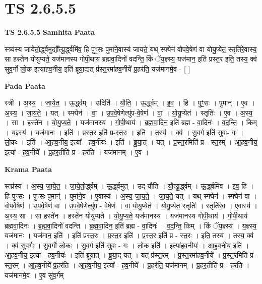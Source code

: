 \documentclass[17pt]{extarticle}
\begin{document}
\section{ TS 2.6.5.5 }

\textbf{TS 2.6.5.5 } \newline
\textbf{Samhita Paata} \newline

स्त्र्य॑स्य जायेतो॒र्द्ध्वमुद्यौ᳚त्यू॒र्द्ध्वमि॑व॒ हि पुꣳ॒॒सः पुमा॑ने॒वास्य॑ जायते॒ यथ् स्फ्येन॑ वोपवे॒षेण॑ वा योयु॒प्येत॒ स्तृति॑रे॒वास्य॒ सा हस्ते॑न योयुप्यते॒ यज॑मानस्य गोपी॒थाय॑ ब्रह्मवा॒दिनो॑ वदन्ति॒ किं ॅय॒ज्ञ्स्य॒ यज॑मान॒ इति॑ प्रस्त॒र इति॒ तस्य॒ क्व॑ सुव॒र्गो लो॒क इत्या॑हव॒नीय॒ इति॑ ब्रूया॒द्यत् प्र॑स्त॒रमा॑हव॒नीये᳚ प्र॒हर॑ति॒ यज॑मानमे॒व - [  ] \newline

\textbf{Pada Paata} \newline

स्त्री । अ॒स्य॒ । जा॒ये॒त॒ । ऊ॒र्द्ध्वम् । उदिति॑ । यौ॒ति॒ । ऊ॒र्द्ध्वम् । इ॒व॒ । हि । पुꣳ॒॒सः । पुमान्॑ । ए॒व । अ॒स्य॒ । जा॒य॒ते॒ । यत् । स्फ्येन॑ । वा॒ । उ॒प॒वे॒षेणेत्यु॑प-वे॒षेण॑ । वा॒ । यो॒यु॒प्येत॑ । स्तृतिः॑ । ए॒व । अ॒स्य॒ । सा । हस्ते॑न । यो॒यु॒प्य॒ते॒ । यज॑मानस्य । गो॒पी॒थाय॑ । ब्र॒ह्म॒वा॒दिन॒ इति॑ ब्रह्म - वा॒दिनः॑ । व॒द॒न्ति॒ । किम् । य॒ज्ञ्स्य॑ । यज॑मानः । इति॑ । प्र॒स्त॒र इति॑ प्र-स्त॒रः । इति॑ । तस्य॑ । क्व॑ । सु॒व॒र्ग इति॑ सुवः- गः । लो॒कः । इति॑ । आ॒ह॒व॒नीय॒ इत्या᳚ - ह॒व॒नीयः॑ । इति॑ । ब्रू॒या॒त् । यत् । प्र॒स्त॒रमिति॑ प्र - स्त॒रम् । आ॒ह॒व॒नीय॒ इत्या᳚ - ह॒व॒नीये᳚ । प्र॒हर॒तीति॑ प्र - हर॑ति । यज॑मानम् । ए॒व ।  \newline


\textbf{Krama Paata} \newline

स्त्य्र॑स्य । अ॒स्य॒ जा॒ये॒त॒ । जा॒ये॒तो॒र्द्ध्वम् । ऊ॒र्द्ध्वमुत् । उद् यौ॑ति । यौ॒त्यू॒र्द्ध्वम् । ऊ॒र्द्ध्वमि॑व । इ॒व॒ हि । हि पुꣳ॒॒सः । पुꣳ॒॒सः पुमान्॑ । पुमा॑ने॒व । ए॒वास्य॑ । अ॒स्य॒ जा॒य॒ते॒ । जा॒य॒ते॒ यत् । यथ् स्फ्येन॑ । स्फ्येन॑ वा । वो॒प॒वे॒षेण॑ । उ॒प॒वे॒षेण॑ वा । उ॒प॒वे॒षेणेत्यु॑प - वे॒षेण॑ । वा॒ यो॒यु॒प्येत॑ । यो॒यु॒प्येत॒ स्तृतिः॑ । स्तृति॑रे॒व । ए॒वास्य॑ । अ॒स्य॒ सा । सा हस्ते॑न । हस्ते॑न योयुप्यते । यो॒यु॒प्य॒ते॒ यज॑मानस्य । यज॑मानस्य गोपी॒थाय॑ । गो॒पी॒थाय॑ ब्रह्मवा॒दिनः॑ । ब्र॒ह्म॒वा॒दिनो॑ वदन्ति । ब्र॒ह्म॒वा॒दिन॒ इति॑ ब्रह्म - वा॒दिनः॑ । व॒द॒न्ति॒ किम् । किं ॅय॒ज्ञ्स्य॑ । य॒ज्ञ्स्य॒ यज॑मानः । यज॑मान॒ इति॑ । इति॑ प्रस्त॒रः । प्र॒स्त॒र इति॑ । प्र॒स्त॒र इति॑ प्र - स्त॒रः । इति॒ तस्य॑ । तस्य॒ क्व॑ । क्व॑ सुव॒र्गः । सु॒व॒र्गो लो॒कः । सु॒व॒र्ग इति॑ सुवः - गः । लो॒क इति॑ । इत्या॑हव॒नीयः॑ । आ॒ह॒व॒नीय॒ इति॑ । आ॒ह॒व॒नीय॒ इत्या᳚ - ह॒व॒नीयः॑ । इति॑ ब्रूयात् । ब्रू॒या॒द् यत् । यत् प्र॑स्त॒रम् । प्र॒स्त॒रमा॑हव॒नीये᳚ । प्र॒स्त॒रमिति॑ प्र - स्त॒रम् । आ॒ह॒व॒नीये᳚ प्र॒हर॑ति । आ॒ह॒व॒नीय॒ इत्या᳚ - ह॒व॒नीये᳚ । प्र॒हर॑ति॒ यज॑मानम् । प्र॒हर॒तीति॑ प्र - हर॑ति । यज॑मानमे॒व । ए॒व सु॑व॒र्गम् \newline
\end{document}
